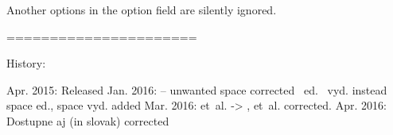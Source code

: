 Another options in the option field are silently ignored.

======================

History:

Apr. 2015: Released
Jan. 2016: \doyear -- unwanted space corrected
           ~ed. ~vyd. instead space ed., space vyd.
           \frenchspacing added
Mar. 2016: et~al. -> , et~al. corrected.
Apr. 2016: Dostupne aj (in slovak) corrected
